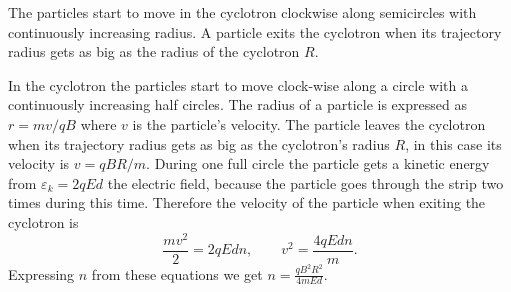 \hinteng
The particles start to move in the cyclotron clockwise along semicircles with continuously increasing radius. A particle exits the cyclotron when its trajectory radius gets as big as the radius of the cyclotron $R$.

\solueng
In the cyclotron the particles start to move clock-wise along a circle with a continuously increasing half circles. The radius of a particle is expressed as $r=mv/qB$ where $v$ is the particle’s velocity. The particle leaves the cyclotron when its trajectory radius gets as big as the cyclotron’s radius $R$, in this case its velocity is $v=qBR/m$. During one full circle the particle gets a kinetic energy from $\varepsilon_k=2qEd$ the electric field, because the particle goes through the strip two times during this time. Therefore the velocity of the particle when exiting the cyclotron is
\[\frac{mv^2}{2}=2qEdn, \qquad v^2=\frac{4qEdn}{m}.\]
Expressing $n$ from these equations we get $\displaystyle n=\frac{qB^2R^2}{4mEd}$.
\probend